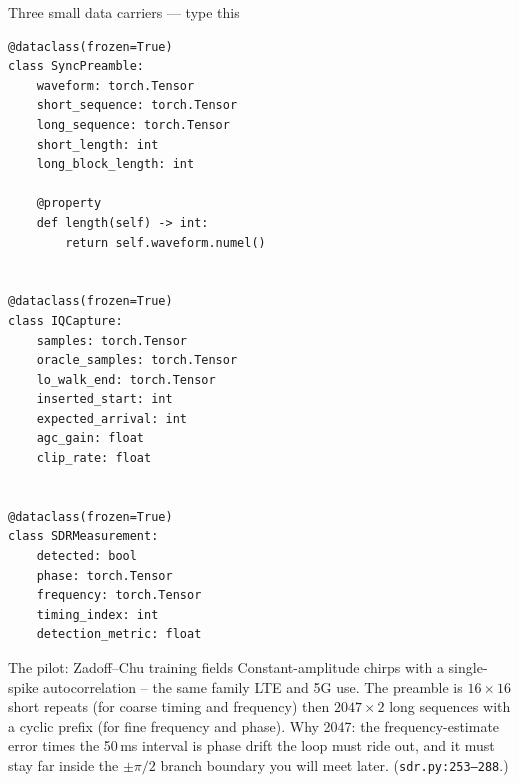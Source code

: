 \documentclass[10pt]{beamer}
\begin{document}
\begin{frame}[fragile]{Three small data carriers --- type this}
\begin{lstlisting}[basicstyle=\ttfamily\tiny]
@dataclass(frozen=True)
class SyncPreamble:
    waveform: torch.Tensor
    short_sequence: torch.Tensor
    long_sequence: torch.Tensor
    short_length: int
    long_block_length: int

    @property
    def length(self) -> int:
        return self.waveform.numel()


@dataclass(frozen=True)
class IQCapture:
    samples: torch.Tensor
    oracle_samples: torch.Tensor
    lo_walk_end: torch.Tensor
    inserted_start: int
    expected_arrival: int
    agc_gain: float
    clip_rate: float


@dataclass(frozen=True)
class SDRMeasurement:
    detected: bool
    phase: torch.Tensor
    frequency: torch.Tensor
    timing_index: int
    detection_metric: float
\end{lstlisting}
\end{frame}

\begin{frame}{The pilot: Zadoff--Chu training fields}
  Constant-amplitude chirps with a single-spike
  autocorrelation -- the same family LTE and 5G use. The
  preamble is $16\times16$ short repeats (for coarse timing and
  frequency) then $2047\times2$ long sequences with a cyclic
  prefix (for fine frequency and phase). Why 2047: the
  frequency-estimate error times the 50\,ms interval is phase
  drift the loop must ride out, and it must stay far inside
  the $\pm\pi/2$ branch boundary you will meet later.
  (\texttt{sdr.py:253--288}.)
\end{frame}
\end{document}
